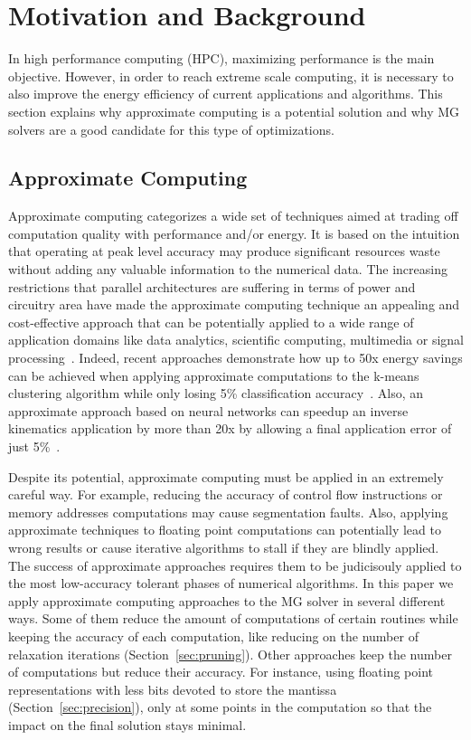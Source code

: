 \section{Motivation and Background}
\label{sec:motivation}

In high performance computing (HPC), maximizing performance is the main
objective. However, in order to reach extreme scale computing, it is necessary
to also improve the energy efficiency of current applications and algorithms.
This section explains why approximate computing is a potential solution and why
MG solvers are a good candidate for this type of optimizations.

\subsection{Approximate Computing}
\label{sec:approx}


Approximate computing categorizes a wide set of techniques aimed at trading off
computation quality with performance and/or energy.  It is based on the
intuition that operating at peak level accuracy may produce significant
resources waste without adding any valuable information to the numerical data.
The increasing restrictions that parallel architectures are suffering in terms
of power and circuitry area have made the approximate computing technique an
appealing and cost-effective approach that can be potentially applied to a wide
range of application domains like data analytics, scientific computing,
multimedia or signal processing~\cite{Mittal2016}.  Indeed, recent approaches
demonstrate how up to 50x energy savings can be achieved when applying
approximate computations to the k-means clustering algorithm while only losing
5\% classification accuracy~\cite{Chippa2013}.  Also, an approximate approach
based on neural networks can speedup an inverse kinematics application by more
than 20x by allowing a final application error of just
5\%~\cite{Grigorian2015}.

Despite its potential, approximate computing must be applied in an extremely
careful way.  For example, reducing the accuracy of control flow instructions
or memory addresses computations may cause segmentation faults.  Also, applying
approximate techniques to floating point computations can potentially lead to 
wrong results or cause iterative algorithms to stall if they are blindly
applied.  The success of approximate approaches requires them to be judicisouly
applied to the most low-accuracy tolerant phases of numerical algorithms.  In
this paper we apply approximate computing approaches to the MG solver in
several different ways.  Some of them reduce the amount of computations of
certain routines while keeping the accuracy of each computation, like reducing
on the number of relaxation iterations (Section~\ref{sec:pruning}).  Other
approaches keep the number of computations but reduce their accuracy. For instance,
using floating point representations with less bits devoted to store the
mantissa (Section~\ref{sec:precision}), only at some points in the computation
so that the impact on the final solution stays minimal.


